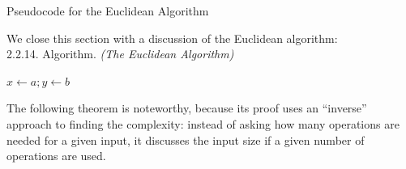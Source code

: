 \documentclass[smaller,hyperref={CJKbookmarks=true}]{beamer}
\newcounter{zhuo}[subsection]
\begin{document}
\begin{frame}[t]{Pseudocode for the Euclidean Algorithm}
\begin{spacing}{1.1}
We close this section with a discussion of the Euclidean algorithm:\\[5pt]
\alert{2.2.14. Algorithm.} \emph{(The Euclidean Algorithm)}\\[2pt]
\IncMargin{1em}
\begin{algorithm}[H]
$x\leftarrow a;y\leftarrow b$\;
\end{algorithm}
\DecMargin{1em}
\vspace*{5pt}
The following theorem is noteworthy, because its proof uses an ``inverse''
approach to finding the complexity: instead of asking how many
operations are needed for a given input, it discusses the input size if a
given number of operations are used.
\end{spacing}
\end{frame}
\end{document}
